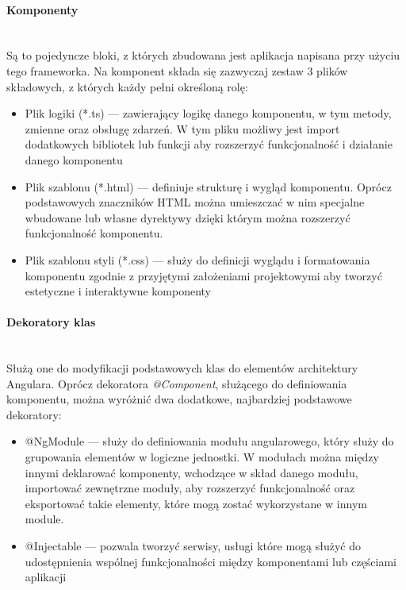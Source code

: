 \paragraph{Komponenty}\mbox{}\\
Są to pojedyncze bloki, z których zbudowana jest aplikacja napisana przy użyciu tego frameworka. Na komponent składa się zazwyczaj zestaw 3 plików składowych, z których każdy pełni określoną rolę:
\begin{itemize}
  \item Plik logiki (*.ts) --- zawierający logikę danego komponentu, w tym metody, zmienne oraz obsługę zdarzeń. W tym pliku możliwy jest import dodatkowych bibliotek lub funkcji aby rozszerzyć funkcjonalność i działanie danego komponentu 
  \item Plik szablonu (*.html) --- definiuje strukturę i wygląd komponentu. Oprócz podstawowych znaczników HTML można umieszczać w nim specjalne wbudowane lub własne dyrektywy dzięki którym można rozszerzyć funkcjonalność komponentu.
  \item Plik szablonu styli (*.css) --- służy do definicji wyglądu i formatowania komponentu zgodnie z przyjętymi założeniami projektowymi aby tworzyć estetyczne i interaktywne komponenty
\end{itemize}

\paragraph{Dekoratory klas}\mbox{}\\
Służą one do modyfikacji podstawowych klas do elementów architektury Angulara. Oprócz dekoratora \emph{@Component}, służącego do definiowania komponentu, można wyróżnić dwa dodatkowe, najbardziej podstawowe dekoratory:
\begin{itemize}
  \item @NgModule --- służy do definiowania modułu angularowego, który służy do grupowania elementów w logiczne jednostki. W modułach można między innymi deklarować komponenty, wchodzące w skład danego modułu, importować zewnętrzne moduły, aby rozszerzyć funkcjonalność oraz eksportować takie elementy, które mogą zostać wykorzystane w innym module.
  \item @Injectable --- pozwala tworzyć serwisy, usługi które mogą służyć do udostępnienia wspólnej funkcjonalności między komponentami lub częściami aplikacji
\end{itemize}

